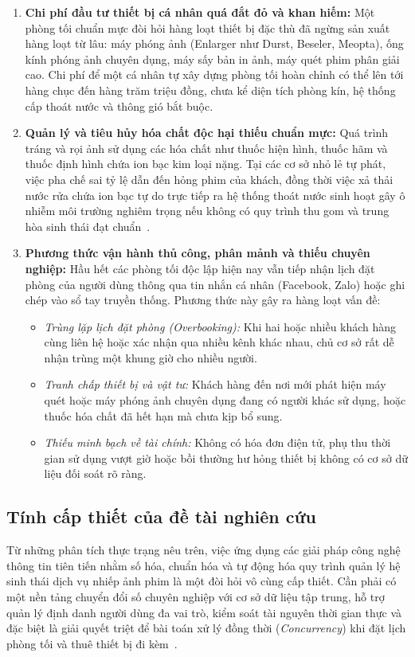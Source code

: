 \begin{enumerate}[leftmargin=2em]
    \item \textbf{Chi phí đầu tư thiết bị cá nhân quá đắt đỏ và khan hiếm:} 
    Một phòng tối chuẩn mực đòi hỏi hàng loạt thiết bị đặc thù đã ngừng sản xuất hàng loạt từ lâu: máy phóng ảnh (Enlarger như Durst, Beseler, Meopta), ống kính phóng ảnh chuyên dụng, máy sấy bản in ảnh, máy quét phim phân giải cao. Chi phí để một cá nhân tự xây dựng phòng tối hoàn chỉnh có thể lên tới hàng chục đến hàng trăm triệu đồng, chưa kể diện tích phòng kín, hệ thống cấp thoát nước và thông gió bắt buộc.
    
    \item \textbf{Quản lý và tiêu hủy hóa chất độc hại thiếu chuẩn mực:}
    Quá trình tráng và rọi ảnh sử dụng các hóa chất như thuốc hiện hình, thuốc hãm và thuốc định hình chứa ion bạc kim loại nặng. Tại các cơ sở nhỏ lẻ tự phát, việc pha chế sai tỷ lệ dẫn đến hỏng phim của khách, đồng thời việc xả thải nước rửa chứa ion bạc tự do trực tiếp ra hệ thống thoát nước sinh hoạt gây ô nhiễm môi trường nghiêm trọng nếu không có quy trình thu gom và trung hòa sinh thái đạt chuẩn~\cite{rogers2023sustainable}.
    
    \item \textbf{Phương thức vận hành thủ công, phân mảnh và thiếu chuyên nghiệp:}
    Hầu hết các phòng tối độc lập hiện nay vẫn tiếp nhận lịch đặt phòng của người dùng thông qua tin nhắn cá nhân (Facebook, Zalo) hoặc ghi chép vào sổ tay truyền thống. Phương thức này gây ra hàng loạt vấn đề:
    \begin{itemize}
        \item \textit{Trùng lặp lịch đặt phòng (Overbooking):} Khi hai hoặc nhiều khách hàng cùng liên hệ hoặc xác nhận qua nhiều kênh khác nhau, chủ cơ sở rất dễ nhận trùng một khung giờ cho nhiều người.
        \item \textit{Tranh chấp thiết bị và vật tư:} Khách hàng đến nơi mới phát hiện máy quét hoặc máy phóng ảnh chuyên dụng đang có người khác sử dụng, hoặc thuốc hóa chất đã hết hạn mà chưa kịp bổ sung.
        \item \textit{Thiếu minh bạch về tài chính:} Không có hóa đơn điện tử, phụ thu thời gian sử dụng vượt giờ hoặc bồi thường hư hỏng thiết bị không có cơ sở dữ liệu đối soát rõ ràng.
    \end{itemize}
\end{enumerate}

\subsection{Tính cấp thiết của đề tài nghiên cứu}
Từ những phân tích thực trạng nêu trên, việc ứng dụng các giải pháp công nghệ thông tin tiên tiến nhằm số hóa, chuẩn hóa và tự động hóa quy trình quản lý hệ sinh thái dịch vụ nhiếp ảnh phim là một đòi hỏi vô cùng cấp thiết. Cần phải có một nền tảng chuyển đổi số chuyên nghiệp với cơ sở dữ liệu tập trung, hỗ trợ quản lý định danh người dùng đa vai trò, kiểm soát tài nguyên thời gian thực và đặc biệt là giải quyết triệt để bài toán xử lý đồng thời (\textit{Concurrency}) khi đặt lịch phòng tối và thuê thiết bị đi kèm~\cite{habibi2024towards, zhang2023adaptive}.

